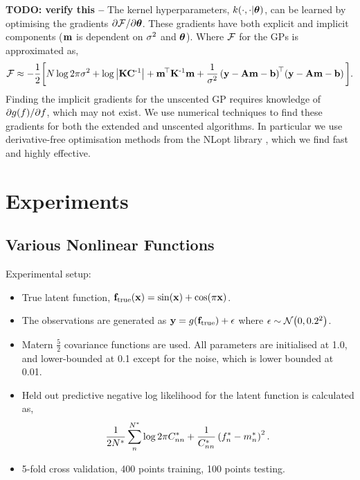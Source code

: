 \documentclass{article} %
\begin{document}
\textbf{TODO: verify this --} The kernel hyperparameters,
$k\!\left({{\cdot}, {\cdot|\boldsymbol\theta}}\right)$, can be learned by optimising the gradients
$\partial\mathcal{F}/\partial\boldsymbol\theta$. These gradients have both explicit and
implicit components ($\mathbf{m}$ is dependent on $\sigma^2$ and $\boldsymbol\theta$). Where
$\mathcal{F}$ for the GPs is approximated as,
\begin{equation}
    \mathcal{F} \approx - \frac{1}{2} \bigg[
        N\log{2\pi\ensuremath{\sigma^2}} + \log\left|{\mathbf{K}\mathbf{C}^{\text{-}1}}\right|
    + \mathbf{m}^{\!\top}\mathbf{K}^{\text{-}1} \mathbf{m}
    + \frac{1}{\sigma^2}
        \left({\mathbf{y} - \mathbf{A}\mathbf{m} - \mathbf{b}}\right)^{\!\top}\!
        \left({\mathbf{y} - \mathbf{A}\mathbf{m} - \mathbf{b}}\right)
    \bigg].
    \label{eq:fengygp}
\end{equation}
Finding the implicit gradients for the unscented GP requires knowledge of
$\partial g\!\left({{f}}\right)\!/\partial f$, which may not exist. We use
numerical techniques to find these gradients for both the extended and
unscented algorithms. In particular we use derivative-free optimisation methods
from the NLopt library \cite{JohnsonNLOPT}, which we find fast and highly
effective.


\section{Experiments}
\label{sec:experiments}

\subsection{Various Nonlinear Functions}
\label{sec:exptoy}

Experimental setup:
\begin{itemize}

    \item True latent function, $\mathbf{f}_{\text{true}}\!\left({\mathbf{x}}\right) =
        \sin\!\left({\mathbf{x}}\right) + \cos\!\left({\pi\mathbf{x}}\right)$.

    \item The observations are generated as $\mathbf{y} =
        g\!\left({{\mathbf{f}_\text{true}}}\right) + \epsilon$ where $\epsilon \sim \mathcal{N}\!\left({0,
            0.2^2}\right)$.
    
    \item Matern $\frac{5}{2}$ covariance functions are used. All parameters
        are initialised at 1.0, and lower-bounded at 0.1 except for the noise,
        which is lower bounded at 0.01.

    \item Held out predictive negative log likelihood for the latent function
        is calculated as,
        \begin{equation}
            \frac{1}{2N^{*}} \sum^{N^{*}}_n \log{2\pi\ensuremath{C}\ensuremath{^{*}}_{nn}}
                + \frac{1}{C^{*}_{nn}} \left({f^{*}_n -
                    m^{*}_n}\right)^2.
        \end{equation}

    \item 5-fold cross validation, 400 points training, 100 points testing.

\end{itemize}
\end{document}
